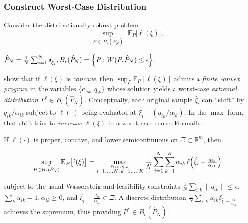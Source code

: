 \subsubsection{Construct Worst-Case Distribution}
\label{subsec:concavity_dro_theorem}

Consider the distributionally robust problem
$$
\label{eq:DRO_concave}
\sup_{P \,\in\, B_\epsilon(\hat{P}_N)}\,\;
\mathbb{E}_P\bigl[\ell(\xi)\bigr], 
$$

$\hat{P}_N = \tfrac1N \sum_{i=1}^N \delta_{\hat{\xi}_i},
B_\epsilon(\hat{P}_N)=\Bigl\{
  P : W(P,\hat{P}_N)\le \epsilon
\Bigr\}.$

\citet{Esfahani2018Data} show that if $\ell(\xi)$ is 
\emph{concave}, then 
$\sup_{P} \mathbb{E}_P[\ell(\xi)]$
admits a \emph{finite convex program} in the variables 
$\{\alpha_{ik}, q_{ik}\}$ whose solution yields 
a worst-case \emph{extremal distribution} $P^*\in B_\epsilon(\hat{P}_N)$.  
Conceptually, each original sample $\hat{\xi}_i$ can “shift” by $q_{ik}/\alpha_{ik}$ 
subject to $\ell(\cdot)$ being evaluated at $\hat{\xi}_i - (q_{ik}/\alpha_{ik})$.  
In the $\max$-form, that shift tries to \emph{increase} 
$\ell(\xi)$ in a worst-case sense. Formally.

\begin{theorem}
\label{thm:worst_case_concave}
If $\ell(\cdot)$ is proper, concave, and lower semicontinuous on $\Xi \subset \mathbb{R}^m$, 
then
\begin{tiny}
\begin{align*}
\sup_{P\in B_\epsilon(\hat{P}_N)}
\mathbb{E}_P\bigl[\ell(\xi)\bigr]=\max_{\substack{\alpha_{ik},\,q_{ik}\\i=1,\dots,N;\,k=1,\dots,K}}
\frac{1}{N} \sum_{i=1}^N \sum_{k=1}^K
\alpha_{ik}
\,\ell\Bigl(\hat{\xi}_i-\tfrac{q_{ik}}{\alpha_{ik}}\Bigr)
\end{align*}
\end{tiny}
subject to the usual Wasserstein and feasibility constraints
$\tfrac{1}{N}\sum_{i,k}\|q_{ik}\|\le \epsilon$, 
$\sum_{k}\alpha_{ik}=1, \alpha_{ik}\ge 0$, and 
$\hat{\xi}_i-\tfrac{q_{ik}}{\alpha_{ik}}\in \Xi$.  
A discrete distribution 
$\tfrac{1}{N}\sum_{i,k} \alpha_{ik} \delta_{\hat{\xi}_i - \tfrac{q_{ik}}{\alpha_{ik}}}$
achieves the supremum, thus providing $P^*\in B_\epsilon(\hat{P}_N)$.
\end{theorem}

